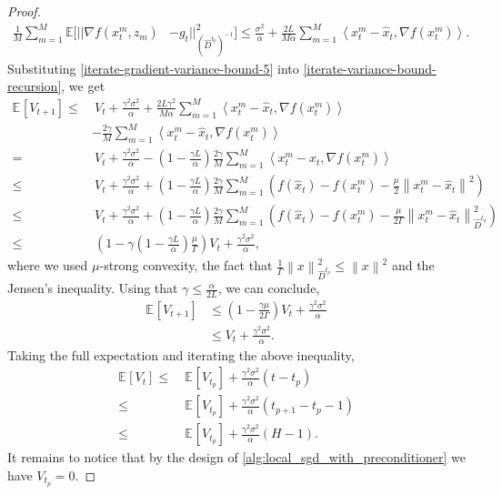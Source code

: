 \documentclass[sn-mathphys,Numbered]{sn-jnl}%
\renewcommand{\|}{\parallel}
\newcommand\ec[2][]{\ensuremath{\mathbb{E}_{#1} \left[#2\right]}}
\newcommand\ev[1]{\left \langle #1 \right \rangle}
\newcommand\br[1]{\left ( #1 \right )}
\newcommand{\sqn}[1]{{\left\lVert#1\right\rVert}^2}
\renewcommand {\*} {\ast}
\begin{document}
\begin{proof}
     \begin{align}
         \label{iterate-gradient-variance-bound-5}
         \frac{1}{M} \sum\limits_{m=1}^M \mathbb{E}\Big[ ||\nabla f(x_t^m, z_m) &- g_t||^2_{(\hat{D}^{t_p})^{-1}}\Big]  \leq \frac{\sigma^2}{\alpha}  + \frac{2L}{M\alpha} \sum\limits_{m=1}^M \ev{x_t^m - \hat x_t, \nabla f(x_t^m)}.
     \end{align}
     Substituting \eqref{iterate-gradient-variance-bound-5} into \eqref{iterate-variance-bound-recursion}, we get
     \begin{align*}
         \ec{V_{t+1}} 
         \le&\ V_t + \frac{\gamma^2 \sigma^2}{\alpha} + \frac{2L \gamma^2}{M\alpha} \sum\limits_{m=1}^M \ev{x_t^m - \hat x_t, \nabla f(x_t^m)}   \\ &- \frac{2 \gamma}{M} \sum\limits_{m=1}^M \ev{x_t^m - \hat{x}_t, \nabla f(x_t^m)} \nonumber \\
         \label{iterate-variance-recursion-pre-sc}
         =&\ V_t + \frac{\gamma^2 \sigma^2}{\alpha} - \left(1 - \frac{\gamma L}{\alpha}\right)\frac{2 \gamma}{M} \sum\limits_{m=1}^M \ev{x_t^m - \hat{x}_t, \nabla f(x_t^m)} \\
         {\le}&\ V_t + \frac{\gamma^2 \sigma^2}{\alpha} + \left(1 - \frac{\gamma L}{\alpha}\right)\frac{2 \gamma}{M} \sum\limits_{m=1}^M (f(\hat{x}_t) - f(x_t^m) - \frac{\mu}{2}\sqn{x_t^m - \hat{x}_t}) \\
         \leq&\ V_t + \frac{\gamma^2 \sigma^2}{\alpha} + \left(1 - \frac{\gamma L}{\alpha}\right)\frac{2 \gamma}{M} \sum\limits_{m=1}^M (f(\hat{x}_t) - f(x_t^m) - \frac{\mu}{2\Gamma}\sqn{x_t^m - \hat{x}_t}_{\hat{D}^{t_p}}) \\
         \leq&\ \br{1 - \gamma\left(1 - \frac{\gamma L}{\alpha}\right)\frac{\mu}{\Gamma}} V_t + \frac{\gamma^2\sigma^2}{\alpha}, \nonumber
     \end{align*}
      where we used $\mu$-strong convexity, the fact that $\frac{1}{\Gamma}\sqn{x}_{\hat{D}^{t_p}} \leq \sqn{x}$ and the Jensen's inequality. Using that $\gamma \leq \frac{\alpha}{2L}$, we can conclude,
     \begin{align*}
         \ec{V_{t+1}}
         &\le \br{1 - \frac{\gamma\mu}{2\Gamma}} V_t + \frac{\gamma^2\sigma^2}{\alpha} \\
         &\le V_t + \frac{\gamma^2\sigma^2}{\alpha}.
     \end{align*}
     Taking the full expectation and iterating the above inequality,
     \begin{align*}
         \ec{V_t} \leq&\ \ec{V_{t_p}} + \frac{\gamma^2\sigma^2}{\alpha} \br{t - t_p} \\
         \leq&\ \ec{V_{t_p}} + \frac{\gamma^2\sigma^2}{\alpha} \br{t_{p+1} - t_p - 1} \\
         \leq&\ \ec{V_{t_p}} + \frac{\gamma^2\sigma^2}{\alpha} \br{H - 1}.
     \end{align*}
     It remains to notice that by the design of \cref{alg:local_sgd_with_preconditioner} we have $V_{t_p} = 0$.
\end{proof}
\end{document}
